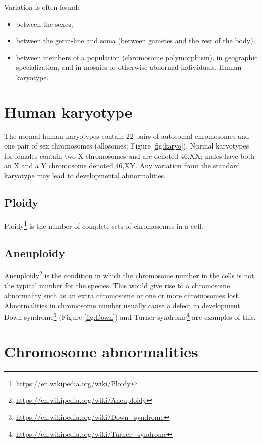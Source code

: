 \documentclass[]{book}
\providecommand{\tightlist}{%
  \setlength{\itemsep}{0pt}\setlength{\parskip}{0pt}}
\let\rmarkdownfootnote\footnote%
\def\footnote{\protect\rmarkdownfootnote}
\renewcommand{\href}[2]{#2\footnote{\url{#1}}}
\begin{document}
Variation is often found:

\begin{itemize}
\tightlist
\item
  between the sexes,
\item
  between the germ-line and soma (between gametes and the rest of the body),
\item
  between members of a population (chromosome polymorphism),
  in geographic specialization, and
  in mosaics or otherwise abnormal individuals.
  Human karyotype.
\end{itemize}

\hypertarget{human-karyotype}{%
\section{Human karyotype}\label{human-karyotype}}

The normal human karyotypes contain 22 pairs of autosomal chromosomes and one pair of sex chromosomes (allosomes; Figure \ref{fig:karyo}). Normal karyotypes for females contain two X chromosomes and are denoted 46,XX; males have both an X and a Y chromosome denoted 46,XY. Any variation from the standard karyotype may lead to developmental abnormalities.

\hypertarget{ploidy}{%
\subsection{Ploidy}\label{ploidy}}

\href{https://en.wikipedia.org/wiki/Ploidy}{Ploidy} is the number of complete sets of chromosomes in a cell.

\hypertarget{aneuploidy}{%
\subsection{Aneuploidy}\label{aneuploidy}}

\href{https://en.wikipedia.org/wiki/Aneuploidy}{Aneuploidy} is the condition in which the chromosome number in the cells is not the typical number for the species. This would give rise to a chromosome abnormality such as an extra chromosome or one or more chromosomes lost. Abnormalities in chromosome number usually cause a defect in development. \href{https://en.wikipedia.org/wiki/Down_syndrome}{Down syndrome} (Figure \ref{fig:Down}) and \href{https://en.wikipedia.org/wiki/Turner_syndrome}{Turner syndrome} are examples of this.

\hypertarget{chromosome-abnormalities}{%
\section{Chromosome abnormalities}\label{chromosome-abnormalities}}
\end{document}
